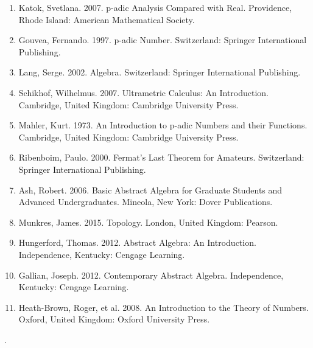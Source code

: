 \documentclass[a4paper]{article}
\begin{document}
\begin{enumerate}
  \item Katok, Svetlana. 2007. p-adic Analysis Compared with Real. Providence, Rhode
  Island: American Mathematical Society.
  \item Gouvea, Fernando. 1997. p-adic Number. Switzerland: Springer International
  Publishing.
  \item Lang, Serge. 2002. Algebra. Switzerland: Springer International Publishing.
  \item Schikhof, Wilhelmus. 2007. Ultrametric Calculus: An Introduction. Cambridge,
  United Kingdom: Cambridge University Press.
  \item Mahler, Kurt. 1973. An Introduction to p-adic Numbers and their Functions. 
  Cambridge, United Kingdom: Cambridge University Press.
  \item Ribenboim, Paulo. 2000. Fermat's Last Theorem for Amateurs. Switzerland:
  Springer International Publishing.
  \item Ash, Robert. 2006. Basic Abstract Algebra for Graduate Students and Advanced
  Undergraduates. Mineola, New York: Dover Publications.
  \item Munkres, James. 2015. Topology. London, United Kingdom: Pearson.
  \item Hungerford, Thomas. 2012. Abstract Algebra: An Introduction. Independence,
  Kentucky: Cengage Learning.
  \item Gallian, Joseph. 2012. Contemporary Abstract Algebra. Independence, Kentucky:
  Cengage Learning.
  \item Heath-Brown, Roger, et al. 2008.  An Introduction to the Theory of Numbers.
  Oxford, United Kingdom: Oxford University Press.
\end{enumerate}.
\end{document}
